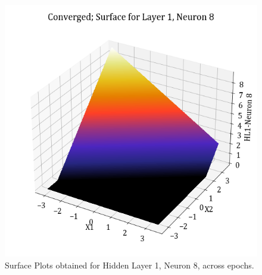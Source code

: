 \documentclass[11pt,a4paper]{article}
\begin{document}
\begin{figure}[H]
    \includegraphics[scale=0.4]{images/1B_MLFFNN_conv_HL1_N8.png}
    \caption{Surface Plots obtained for Hidden Layer 1, Neuron 8, across epochs.}
\end{figure}
\end{document}
